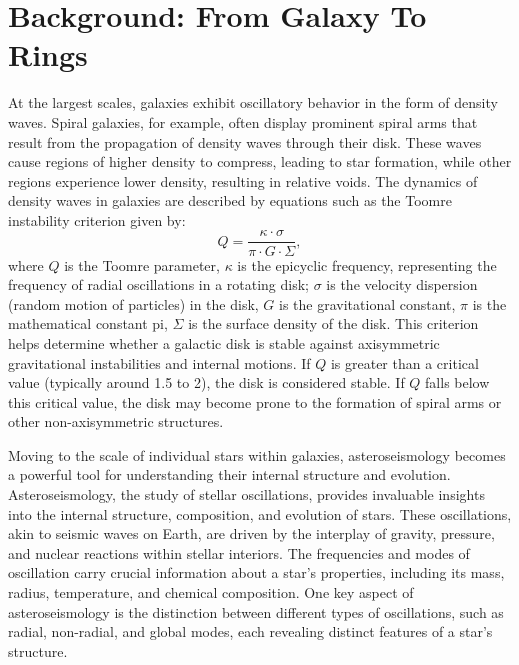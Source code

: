 \documentclass{article}
\begin{document}
\section{Background: From Galaxy To Rings}

At the largest scales, galaxies exhibit oscillatory behavior in the form of density waves. Spiral galaxies, for example, often display prominent spiral arms that result from the propagation of density waves through their disk. These waves cause regions of higher density to compress, leading to star formation, while other regions experience lower density, resulting in relative voids. The dynamics of density waves in galaxies are described by equations such as the Toomre instability criterion given by\cite{2008gady.book.....B, 2002MNRAS.336..785S, 1964ApJ...139.1217T}:
\begin{equation}
Q = \frac{\kappa \cdot \sigma}{\pi \cdot G \cdot \Sigma},
\end{equation}
where \(Q\) is the Toomre parameter, \(\kappa\) is the epicyclic frequency, representing the frequency of radial oscillations in a rotating disk; \(\sigma\) is the velocity dispersion (random motion of particles) in the disk, \(G\) is the gravitational constant, \(\pi\) is the mathematical constant pi, \(\Sigma\) is the surface density of the disk.
This criterion helps determine whether a galactic disk is stable against axisymmetric gravitational instabilities and internal motions. If \(Q\) is greater than a critical value (typically around 1.5 to 2), the disk is considered stable. If \(Q\) falls below this critical value, the disk may become prone to the formation of spiral arms or other non-axisymmetric structures.

Moving to the scale of individual stars within galaxies, asteroseismology becomes a powerful tool for understanding their internal structure and evolution. Asteroseismology, the study of stellar oscillations, provides invaluable insights into the internal structure, composition, and evolution of stars. These oscillations, akin to seismic waves on Earth, are driven by the interplay of gravity, pressure, and nuclear reactions within stellar interiors. The frequencies and modes of oscillation carry crucial information about a star's properties, including its mass, radius, temperature, and chemical composition. One key aspect of asteroseismology is the distinction between different types of oscillations, such as radial, non-radial, and global modes, each revealing distinct features of a star's structure.
\end{document}
